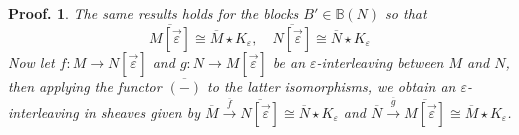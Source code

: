 \documentclass[a4paper, english, 11pt]{article}
\newcommand{\0}{\vec{0}}
\newtheorem*{pf}{Proof.} }
\begin{document}
\begin{pf}
 \smallskip
 
 The same results holds for  the blocks $B'\in 
 \mathbb{B}(N)$ so that 
 $$\overline{M [\vec{\varepsilon}]} \cong \overline{M}\star K_{\varepsilon}, \quad  \overline{N [\vec{\varepsilon}]} \cong \overline{N}\star K_{\varepsilon}$$
 Now let $f: M\to N[\vec{\varepsilon}]$ and $g: N\to M[\vec{\varepsilon}]$ be an $\varepsilon$-interleaving between $M$ and $N$, then applying the functor $\overline{(-)}$ to the latter isomorphisms, we obtain  an $\varepsilon$-interleaving in sheaves given by  
 $ \overline{M}\stackrel{\overline{f}}\to \overline{N[\vec{\varepsilon}]}\cong \overline{N}\star K_\varepsilon$ 
 and $\overline{N}\stackrel{\overline{g}}\to \overline{M[\vec{\varepsilon}]}\cong \overline{M}\star K_{\varepsilon}$.
\end{pf}
\end{document}
